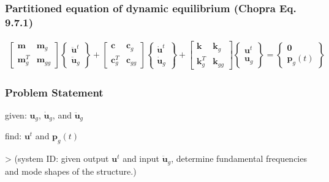 \documentclass[letterpaper,10pt,english]{sphinxmanual}
\begin{document}
\subsubsection{Partitioned equation of dynamic equilibrium (Chopra Eq. 9.7.1)}
\label{\detokenize{examples/05_MIMO_Event:Partitioned-equation-of-dynamic-equilibrium-(Chopra-Eq.-9.7.1)}}\begin{equation*}
\begin{split}\begin{bmatrix}
\mathbf{m} & \mathbf{m}_g \\
\mathbf{m}^T_g & \mathbf{m}_{gg}
\end{bmatrix}
\begin{Bmatrix}
\mathbf{\ddot{u}}^t \\
\mathbf{\ddot{u}}_g
\end{Bmatrix}
+
\begin{bmatrix}
\mathbf{c} & \mathbf{c}_g \\
\mathbf{c}^T_g & \mathbf{c}_{gg}
\end{bmatrix}
\begin{Bmatrix}
\mathbf{\dot{u}}^t \\
\mathbf{\dot{u}}_g
\end{Bmatrix}
+
\begin{bmatrix}
\mathbf{k} & \mathbf{k}_g \\
\mathbf{k}^T_g & \mathbf{k}_{gg}
\end{bmatrix}
\begin{Bmatrix}
\mathbf{u}^t \\
\mathbf{u}_g
\end{Bmatrix}
=
\begin{Bmatrix}
\mathbf{0} \\
\mathbf{p}_g(t)
\end{Bmatrix}\end{split}
\end{equation*}

\subsubsection{Problem Statement}
\label{\detokenize{examples/05_MIMO_Event:Problem-Statement}}
\sphinxAtStartPar
given: \(\mathbf{u}_g\), \(\mathbf{\dot{u}}_g\), and \(\mathbf{\ddot{u}}_g\)

\sphinxAtStartPar
find: \(\mathbf{u}^t\) and \(\mathbf{p}_g(t)\)

\sphinxAtStartPar
\textendash{}\textgreater{} (system ID: given output \(\mathbf{u}^t\) and input \(\mathbf{\ddot{u}}_g\), determine fundamental frequencies and mode shapes of the structure.)
\end{document}

